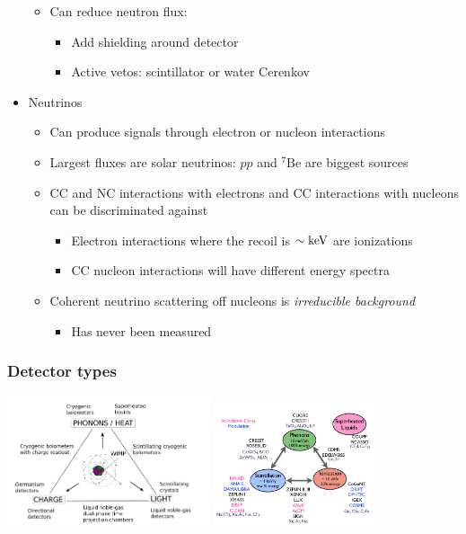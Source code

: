 \begin{itemize}
\begin{itemize}
    \item Can reduce neutron flux:
    \begin{itemize}
      \item Add shielding around detector
      \item Active vetos: scintillator or water Cerenkov
    \end{itemize}
  \end{itemize}
  \item Neutrinos
  \begin{itemize}
    \item Can produce signals through electron or nucleon interactions
    \item Largest fluxes are solar neutrinos: $pp$ and $^7\text{Be}$ are biggest sources
    \item CC and NC interactions with electrons and CC interactions with nucleons can be discriminated against
    \begin{itemize}
      \item Electron interactions where the recoil is $\sim\text{keV}$ are ionizations
      \item CC nucleon interactions will have different energy spectra
    \end{itemize}
    \item Coherent neutrino scattering off nucleons is \emph{irreducible background}
    \begin{itemize}
      \item Has never been measured
    \end{itemize}
  \end{itemize}
\end{itemize}

\subsubsection{Detector types}
\begin{center}
  \includegraphics[width=0.45\textwidth,valign=c]{figs/dd_signals1.png}\quad
  \includegraphics[width=0.35\textwidth,valign=c]{figs/dd_signals2.png}
\end{center}

